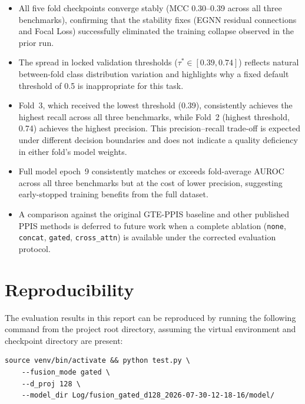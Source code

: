 \documentclass[11pt,a4paper]{article}
\begin{document}
\begin{itemize}
    \item All five fold checkpoints converge stably (MCC 0.30--0.39 across all
          three benchmarks), confirming that the stability fixes (EGNN residual
          connections and Focal Loss) successfully eliminated the training collapse
          observed in the prior run.
    \item The spread in locked validation thresholds ($\tau^* \in [0.39, 0.74]$)
          reflects natural between-fold class distribution variation and highlights
          why a fixed default threshold of 0.5 is inappropriate for this task.
    \item Fold~3, which received the lowest threshold (0.39), consistently achieves
          the highest recall across all three benchmarks, while Fold~2 (highest
          threshold, 0.74) achieves the highest precision. This precision--recall
          trade-off is expected under different decision boundaries and does not
          indicate a quality deficiency in either fold's model weights.
    \item Full model epoch~9 consistently matches or exceeds fold-average AUROC
          across all three benchmarks but at the cost of lower precision, suggesting
          early-stopped training benefits from the full dataset.
    \item A comparison against the original GTE-PPIS baseline and other published
          PPIS methods is deferred to future work when a complete ablation
          (\texttt{none}, \texttt{concat}, \texttt{gated}, \texttt{cross\_attn}) is
          available under the corrected evaluation protocol.
\end{itemize}

\section{Reproducibility}

The evaluation results in this report can be reproduced by running the following
command from the project root directory, assuming the virtual environment and
checkpoint directory are present:

\begin{verbatim}
source venv/bin/activate && python test.py \
    --fusion_mode gated \
    --d_proj 128 \
    --model_dir Log/fusion_gated_d128_2026-07-30-12-18-16/model/
\end{verbatim}
\end{document}
